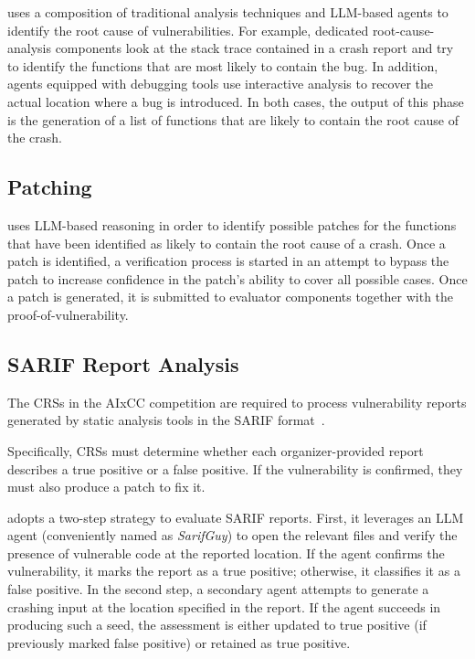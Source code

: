 \artiphishell uses a composition of traditional analysis techniques and LLM-based agents to identify the root cause of vulnerabilities.
For example, dedicated root-cause-analysis components look at the stack trace contained in a crash report and try to identify the functions that are most likely to contain the bug.
In addition, agents equipped with debugging tools use interactive analysis to recover the actual location where a bug is introduced.
In both cases, the output of this phase is the generation of a list of functions that are likely to contain the root cause of the crash.

\subsection{Patching}

\artiphishell uses LLM-based reasoning in order to identify possible patches for the functions that have been identified as likely to contain the root cause of a crash.
Once a patch is identified, a verification process is started in an attempt to bypass the patch to increase confidence in the patch's ability to cover all possible cases.
Once a patch is generated, it is submitted to evaluator components together with the proof-of-vulnerability.

\subsection{SARIF Report Analysis}
The CRSs in the AIxCC competition are required to process vulnerability reports generated by static analysis tools in the SARIF format~\cite{sarif}.

Specifically, CRSs must determine whether each organizer-provided report describes a true positive or a false positive. If the vulnerability is confirmed, they must also produce a patch to fix it.

\artiphishell adopts a two-step strategy to evaluate SARIF reports.
First, it leverages an LLM agent (conveniently named as \emph{SarifGuy}) to open the relevant files and verify the presence of vulnerable code at the reported location. If the agent confirms the vulnerability, it marks the report as a true positive; otherwise, it classifies it as a false positive.
In the second step, a secondary agent attempts to generate a crashing input at the location specified in the report. If the agent succeeds in producing such a seed, the assessment is either updated to true positive (if previously marked false positive) or retained as true positive.

